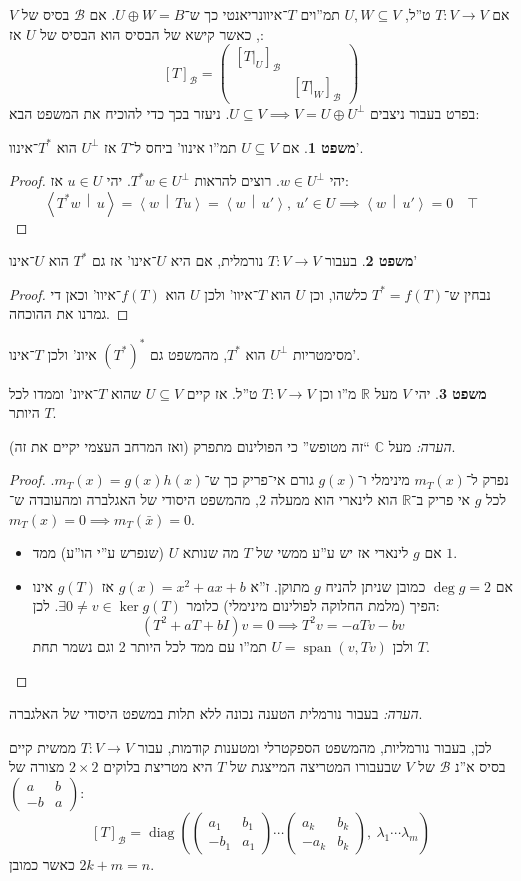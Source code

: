\documentclass[a4paper]{article}
\newcommand\R     {\mathbb{R}}
\newcommand\C     {\mathbb{C}}
\newcommand\bc    {\mathcal{B}}
\newcommand\ra    {\rangle}
\newcommand\la    {\langle}
\DeclareMathOperator{\diag}    {diag}
\DeclareMathOperator{\Sp}      {span}
\newcommand\co        {\colon}
\newcommand\pms[1]    {\begin{pmatrix}
		#1
\end{pmatrix}}
\newcommand\mut [2]   {\left \la #1 \,\middle\vert\, #2 \right \ra}
\renewcommand\lg      {\lambda}
\newcommand\cl [1]    {\left ( #1 \right )}
\theoremstyle{definition}
\newtheorem{Theorem}{משפט}
\newcommand\theo  [1] {\begin{Theorem}#1\end{Theorem}}
\begin{document}
	אם $T \co V \to V$ ט''ל, $U, W \subseteq V$ תמ''וים $T$־איוונריאנטי כך ש־$U \oplus W = B$. אם $\bc$ בסיס של $V$, כאשר קישא של הבסיס הוא הבסיס של $U$ אז: 
	\[ [T]_\bc = \pms{[T|_U]_\bc &  \\  & [T|_W]_\bc} \]
	בפרט בעבור ניצבים $U \subseteq V \implies V = U \oplus U^{\perp}$. ניעזר בכך כדי להוכיח את המשפט הבא: 
	\theo{אם $U \subseteq V$ תמ''ו אינוו' ביחס ל־$T$ אז $U^{\perp}$ הוא $T^*$־אינוו'. }\begin{proof}
		יהי $w \in U^{\perp}$. רוצים להראות $T^*w \in U^{\perp}$. יהי $u \in U$ אז: 
		\[ \mut{T^* w}{u} = \mut{w}{Tu} = \mut{w}{u'}, \ u' \in U \implies \mut{w}{u'} = 0 \quad \top \]
	\end{proof}
	\theo{בעבור $T \co V \to V$ נורמלית, אם היא $U$־אינו' אז גם $T^*$ הוא $U$־אינו'}
	\begin{proof}
		נבחין ש־$T^* = f(T)$ כלשהו, וכן $U$ הוא $T$־איוו' ולכן $U$ הוא $f(T)$־איוו' וכאן די גמרנו את ההוכחה. 
	\end{proof}
	מסימטריות $U^{\perp}$ הוא $T^*$, מהמשפט גם $(T^*)^*$ איונ' ולכן $T$־אינו'. 
	
	\theo{יהי $V$ מעל $\R$ מ''ו וכן $T \co V \to V$ ט''ל. אז קיים $U \subseteq V$ שהוא $T$־איונ' וממדו לכל היותר $T$. }
	\textit{הערה: }מעל $\C$ ``זה מטופש'' כי הפולינום מתפרק (ואז המרחב העצמי יקיים את זה). 
	\begin{proof}
		נפרק ל־$m_T(x)$ מינימלי ו־$g(x)$ גורם אי־פריק כך ש־$m_T(x) = g(x)h(x)$. לכל $g$ אי פריק ב־$\R$ הוא לינארי  הוא ממעלה $2$, מהמשפט היסודי של האגלברה ומהעובדה ש־$m_T(x) = 0 \implies m_T(\bar x) = 0$. 
		\begin{itemize}
			\item אם $g$ לינארי אז יש ע''ע ממשי של $T$ מה שנותא $U$ (שנפרש ע''י הו''ע) ממד $1$. 
			\item אם $\deg g = 2$ כמובן שניתן להניח $g$ מתוקן. ז''א $g(x) = x^2 + ax + b$ אז $g(T)$ אינו הפיך (מלמת החלוקה לפולינום מינימלי) כלומר $\exists 0 \neq v \in \ker g(T)$. 
			לכן: 
			\[ (T^2 + aT + bI)v = 0 \implies T^2v = -a T v - bv \]
			ולכן $U = \Sp(v, Tv)$ תמ''ו עם ממד לכל היותר 2 וגם נשמר תחת $T$. 
		\end{itemize}
	\end{proof}
	
	\textit{הערה: }בעבור נורמלית הטענה נכונה ללא תלות במשפט היסודי של האלגברה. 
	
	לכן, בעבור נורמליות, מהמשפט הספקטרלי ומטענות קודמות, עבור $T \co V \to V$ ממשית קיים בסיס א''נ $\bc$ של $V$ שבעבורו המטריצה המייצגת של $T$ היא מטריצת בלוקים $2 \times 2$ מצורה של $\pms{a & b \\ -b & a}$: 
	\[ [T]_\bc = \diag\cl{\pms{a_1 & b_1 \\ -b_1 & a_1} \cdots \pms{a_k & b_k \\ -a_k & b_k}, \ \lg_1 \cdots \lg_m} \]
	כאשר כמובן $2k + m = n$. 
	
\end{document}

